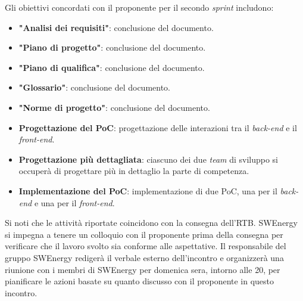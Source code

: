 Gli obiettivi concordati con il proponente per il secondo \textit{sprint}
includono:

\begin{itemize}
	\item \textbf{"Analisi dei requisiti"}: conclusione del documento.

	\item \textbf{"Piano di progetto"}: conclusione del documento.

	\item \textbf{"Piano di qualifica"}: conclusione del documento.

	\item \textbf{"Glossario"}: conclusione del documento.

	\item \textbf{"Norme di progetto"}: conclusione del documento.

	\item \textbf{Progettazione del PoC}: progettazione delle interazioni tra
	      il \textit{back-end} e il \textit{front-end}.

	\item \textbf{Progettazione più dettagliata}: ciascuno dei due \textit{team}
	      di sviluppo si occuperà di progettare più in dettaglio la parte di
	      competenza.

	\item \textbf{Implementazione del PoC}: implementazione di due PoC, una per
	      il \textit{back-end} e una per il \textit{front-end}.
\end{itemize}

Si noti che le attività riportate coincidono con la consegna dell'RTB.
SWEnergy si impegna a tenere un colloquio con il proponente prima della
consegna per verificare che il lavoro svolto sia conforme alle aspettative.
Il responsabile del gruppo SWEnergy redigerà il verbale esterno dell'incontro
e organizzerà una riunione con i membri di SWEnergy per domenica sera, intorno
alle 20, per pianificare le azioni basate su quanto discusso con il proponente
in questo incontro.
